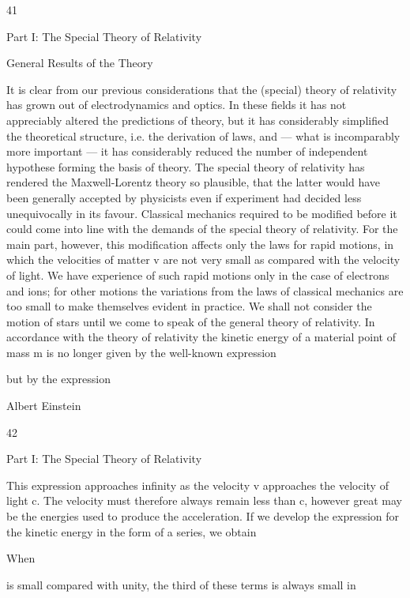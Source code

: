 \documentclass{article}
\begin{document}
41

Part I: The Special Theory of Relativity

General Results of the Theory

It is clear from our previous considerations that the (special) theory of relativity has
grown out of electrodynamics and optics. In these fields it has not appreciably altered the
predictions of theory, but it has considerably simplified the theoretical structure, i.e. the
derivation of laws, and — what is incomparably more important — it has considerably
reduced the number of independent hypothese forming the basis of theory. The special
theory of relativity has rendered the Maxwell-Lorentz theory so plausible, that the latter
would have been generally accepted by physicists even if experiment had decided less
unequivocally in its favour.
Classical mechanics required to be modified before it could come into line with the
demands of the special theory of relativity. For the main part, however, this modification
affects only the laws for rapid motions, in which the velocities of matter v are not very
small as compared with the velocity of light. We have experience of such rapid motions
only in the case of electrons and ions; for other motions the variations from the laws of
classical mechanics are too small to make themselves evident in practice. We shall not
consider the motion of stars until we come to speak of the general theory of relativity. In
accordance with the theory of relativity the kinetic energy of a material point of mass m is
no longer given by the well-known expression

but by the expression

Albert Einstein

42

Part I: The Special Theory of Relativity

This expression approaches infinity as the velocity v approaches the velocity of light c. The
velocity must therefore always remain less than c, however great may be the energies used
to produce the acceleration. If we develop the expression for the kinetic energy in the form
of a series, we obtain

When

is small compared with unity, the third of these terms is always small in
\end{document}
